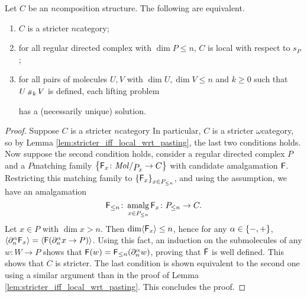 \begin{lem} \label{lem:stricter_n_iff_local_with_dim_le_n}
    Let \( C \) be an \( n \)\nbd composition structure.
    The following are equivalent.
    \begin{enumerate}
        \item \( C \) is a stricter \( n \)\nbd category;
        \item for all regular directed complex with \( \dim P \le n \), \( C \) is local with respect to \( s_P \);
        \item for all pairs of molecules \( U, V \) with \( \dim U, \dim V \le n \) and \( k \geq 0 \) such that \( U \cp{k} V \) is defined, each lifting problem
            \begin{center}
            \end{center}
            has a (necessarily unique) solution.
    \end{enumerate}
\end{lem}
\begin{proof}
    Suppose \( C \) is a stricter \( n \)\nbd category 
    In particular, \( C \) is a stricter \( \omega \)\nbd category, so by Lemma \ref{lem:stricter_iff_local_wrt_pasting}, the last two conditions holds.
    Now suppose the second condition holds, consider a regular directed complex \( P \) and a \( P \)\nbd matching family \( \set{\F_x \colon \molecin{\imel{P}{x}} \to C} \) with candidate amalgamation \( \F \).
    Restricting this matching family to \( \set{\F_x}_{x \in \gr{\le n}{P}} \), and using the assumption, we have an amalgamation 
    \begin{equation*}
        \gr{\le n}{\F} \colon \amalg_{x \in \gr{\le n}{P}} \F_x \colon \gr{\le n}{P} \to C.
    \end{equation*}
    Let \( x \in P \) with \( \dim x > n \).
    Then \( \dim \pcell{\F_x} \le n \), hence for any \( \a \in \set{-, +} \), \( \pcell{\bd{n}{\a} \F_x} = \pcell{\F(\bd{n}{\a} x \to P)} \).
    Using this fact, an induction on the submolecules of any \( w \colon W \to P \) shows that \( \F(w) = \gr{\le n}{\F}(\bd{n}{\a} w) \), proving that \( \F \) is well defined.
    This shows that \( C \) is stricter.
    The last condition is shown equivalent to the second one using a similar argument than in the proof of Lemma \ref{lem:stricter_iff_local_wrt_pasting}.
    This concludes the proof.
\end{proof}

